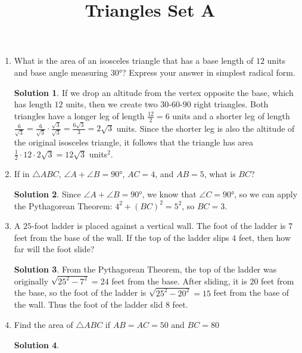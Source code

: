 \documentclass{article}
\title{Triangles Set A}
\date{}
\author{}
\theoremstyle{definition}
\newtheorem*{solution}{Solution}
\begin{document}
\maketitle

\begin{multicols}{2}
    \begin{enumerate}
        \item What is the area of an isosceles triangle that has a base length of $12$ units and base angle measuring $\ang{30}$?
            Express your answer in simplest radical form.
            \begin{solution}
               If we drop an altitude from the vertex opposite the base, which has length $12$ units, then we create two $30$-$60$-$90$ right triangles.
               Both triangles have a longer leg of length $\frac{12}{2} = 6$ units and a shorter leg of length $\frac{6}{\sqrt{3}} = \frac{6}{\sqrt{3}} \cdot \frac{\sqrt{3}}{\sqrt{3}} = \frac{6\sqrt{3}}{3} = 2\sqrt{3}$ units.
               Since the shorter leg is also the altitude of the original isosceles triangle, it follows that the triangle has area $\frac{1}{2} \cdot 12 \cdot 2\sqrt{3} = 12\sqrt{3}$ units$^{2}$. 
            \end{solution}
        \item If in $\triangle ABC$, $\angle A + \angle B = \ang{90}$, $AC = 4$, and $AB = 5$, what is $BC$?
            \begin{solution}
                Since $\angle A + \angle B = \ang{90}$, we know that $\angle C = \ang{90}$, so we can apply the Pythagorean Theorem: $4^2 + (BC)^2 = 5^2$, so $BC = 3$.
            \end{solution}
        \item A $25$-foot ladder is placed against a vertical wall.
            The foot of the ladder is $7$ feet from the base of the wall.
            If the top of the ladder slips $4$ feet, then how far will the foot slide?
            \begin{solution}
                From the Pythagorean Theorem, the top of the ladder was originally $\sqrt{25^2 - 7^2} = 24$ feet from the base.
                After sliding, it is $20$ feet from the base, so the foot of the ladder is $\sqrt{25^2 - 20^2} = 15$ feet from the base of the wall.
                Thus the foot of the ladder slid $8$ feet.
            \end{solution}
        \item Find the area of $\triangle ABC$ if $AB = AC = 50$ and $BC = 80$
            \begin{solution}

\end{solution}
\end{enumerate}
\end{multicols}
\end{document}

